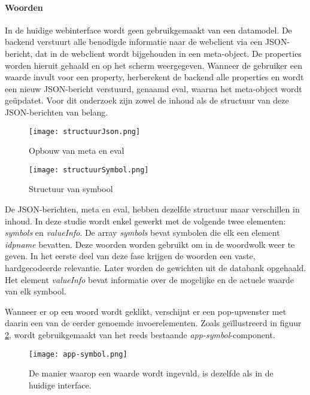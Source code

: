 \paragraph{Woorden}
In de huidige webinterface wordt geen gebruikgemaakt van een datamodel. De backend verstuurt alle benodigde informatie naar de webclient via een JSON-beri\-cht, dat in de webclient wordt bijgehouden in een meta-object. De properties worden hieruit gehaald en op het scherm weergegeven. Wanneer de gebruiker een waarde invult voor een property, herberekent de backend alle properties en wordt een nieuw JSON-bericht verstuurd, genaamd eval, waarna het meta-object wordt geüpdatet. Voor dit onderzoek zijn zowel de inhoud als de structuur van deze JSON-berichten van belang.

\begin{figure}
    \centering
    \begin{minipage}[b]{0.48\textwidth}
        \centering
        \texttt{[image: structuurJson.png]}
        \caption[JSON-bericht]{\label{fig:structuurJson}Opbouw van meta en eval}
    \end{minipage}
    \hfill
    \begin{minipage}[b]{0.48\textwidth}
        \centering
        \texttt{[image: structuurSymbol.png]}
        \caption[Symbool]{\label{fig:structuurSymbol}Structuur van symbool}
    \end{minipage}
\end{figure}

De JSON-berichten, meta en eval, hebben dezelfde structuur maar verschillen in inhoud. In deze studie wordt enkel gewerkt met de volgende twee elementen: \textit{symbols} en \textit{valueInfo}. De array \textit{symbols} bevat symbolen die elk een element \textit{idpname} bevatten. Deze woorden worden gebruikt om in de woordwolk weer te geven. In het eerste deel van deze fase krijgen de woorden een vaste, hardgecodeerde relevantie. Later worden de gewichten uit de databank opgehaald. Het element \textit{valueInfo} bevat informatie over de mogelijke en de actuele waarde van elk symbool.
\medskip
\par Wanneer er op een woord wordt geklikt, verschijnt er een pop-upvenster met daarin een van de eerder genoemde invoerelementen. Zoals geïllustreerd in figuur  \ref{fig:app-symbol}, wordt gebruikgemaakt van het reeds bestaande \textit{app-symbol}-component.
\begin{figure}
    \centering
    \texttt{[image: app-symbol.png]}
    \caption[App-symbol component]{\label{fig:app-symbol}De manier waarop een waarde wordt ingevuld, is dezelfde als in de huidige interface.}
\end{figure}


